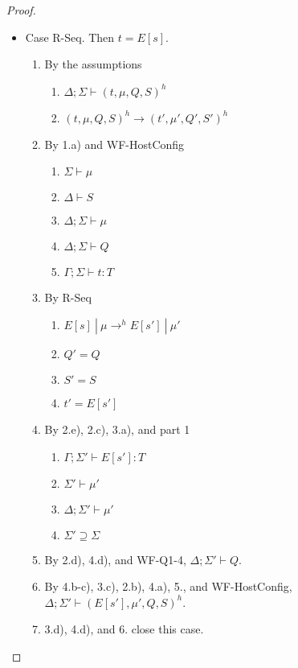 \documentclass{article}
\theoremstyle{definition}
\begin{document}
\begin{proof}
\begin{itemize}
\item Case R-Seq. Then $t = E[s]$.
\begin{enumerate}
\item By the assumptions
  \begin{enumerate}[label=(\alph*)]
  \item $\Delta ; \Sigma \vdash (t, \mu, Q, S)^h$
  \item $(t, \mu, Q, S)^h \longrightarrow (t', \mu', Q', S')^h$
  \end{enumerate}
\item By 1.a) and WF-HostConfig
  \begin{enumerate}[label=(\alph*)]
  \item $\Sigma \vdash \mu$
  \item $\Delta \vdash S$
  \item $\Delta ; \Sigma \vdash \mu$
  \item $\Delta ; \Sigma \vdash Q$
  \item $\Gamma ; \Sigma \vdash t : T$
  \end{enumerate}
\item By R-Seq
  \begin{enumerate}[label=(\alph*)]
  \item $E[s]~|~\mu \rightarrow^h E[s']~|~\mu'$
  \item $Q' = Q$
  \item $S' = S$
  \item $t' = E[s']$
  \end{enumerate}
\item By 2.e), 2.c), 3.a), and part 1
  \begin{enumerate}[label=(\alph*)]
  \item $\Gamma ; \Sigma' \vdash E[s'] : T$
  \item $\Sigma' \vdash \mu'$
  \item $\Delta ; \Sigma' \vdash \mu'$
  \item $\Sigma' \supseteq \Sigma$
  \end{enumerate}
\item By 2.d), 4.d), and WF-Q1-4, $\Delta ; \Sigma' \vdash Q$.
\item By 4.b-c), 3.c), 2.b), 4.a), 5., and WF-HostConfig, $\Delta ; \Sigma' \vdash (E[s'], \mu', Q, S)^h$.
\item 3.d), 4.d), and 6. close this case.
\end{enumerate}


\end{itemize}
\end{proof}
\end{document}
